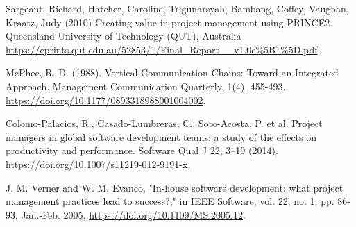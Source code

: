 \documentclass[runningheads]{llncs}
\begin{document}
\begin{thebibliography}{8}
Sargeant, Richard, Hatcher, Caroline, Trigunarsyah, Bambang, Coffey, Vaughan, Kraatz, Judy (2010) Creating value in project management using PRINCE2. Queensland University of Technology (QUT), Australia
\url{https://eprints.qut.edu.au/52853/1/Final_Report__v1.0e%5B1%5D.pdf}.

McPhee, R. D. (1988). Vertical Communication Chains: Toward an Integrated Approach. Management Communication Quarterly, 1(4), 455-493. \url{https://doi.org/10.1177/0893318988001004002}.

Colomo-Palacios, R., Casado-Lumbreras, C., Soto-Acosta, P. et al. Project managers in global software development teams: a study of the effects on productivity and performance. Software Qual J 22, 3–19 (2014). \url{https://doi.org/10.1007/s11219-012-9191-x}.

J. M. Verner and W. M. Evanco, "In-house software development: what project management practices lead to success?," in IEEE Software, vol. 22, no. 1, pp. 86-93, Jan.-Feb. 2005,
\url{https://doi.org/10.1109/MS.2005.12}.

\end{thebibliography}
\end{document}
